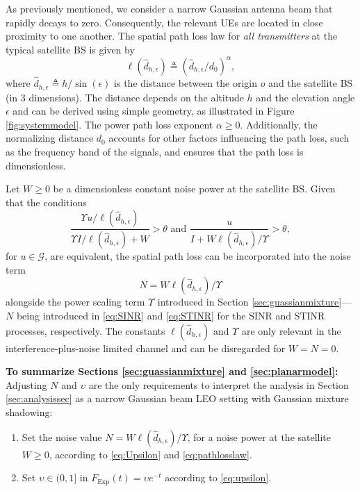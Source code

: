 \documentclass[lettersize,journal]{IEEEtran}
\begin{document}
As previously mentioned, we consider a narrow Gaussian antenna beam that rapidly decays to zero. Consequently, the relevant UEs are located in close proximity to one another. The spatial path loss law for \textit{all transmitters} at the typical satellite BS is given by
\begin{equation}
  \label{eq:pathlosslaw}
  \ell(\hat{d}_{h,\epsilon}) \triangleq \left( {\hat{d}_{h,\epsilon}}/{d_0} \right)^{\alpha},
\end{equation}
where $\hat{d}_{h,\epsilon} \triangleq {h}/{\sin(\epsilon)}$ is the distance between the origin $\textit{o}$ and the satellite BS (in $3$ dimensions). The distance depends on the altitude $h$ and the elevation angle $\epsilon$ and can be derived using simple geometry, as illustrated in Figure \ref{fig:systemmodel}. The power path loss exponent $\alpha \geq 0$. Additionally, the normalizing distance $d_0$ accounts for other factors influencing the path loss, such as the frequency band of the signals, and ensures that the path loss is dimensionless.

Let $W\geq0$ be a dimensionless constant noise power at the satellite BS. Given that the conditions $$\frac{\Upsilon_{}u/\ell(\hat{d}_{h,\epsilon})}{\Upsilon_{}I/\ell(\hat{d}_{h,\epsilon}) + W}>\theta \text{ and } \frac{u}{I + W\ell(\hat{d}_{h,\epsilon})/\Upsilon_{}}> \theta,$$ for $u \in \mathcal{G}$, are equivalent, the spatial path loss can be incorporated into the noise term \begin{equation}N=W\ell(\hat{d}_{h,\epsilon})/\Upsilon_{}\end{equation} alongside the power scaling term $\Upsilon_{}$ introduced in Section \ref{sec:guassianmixture}---$N$ being introduced in \eqref{eq:SINR} and \eqref{eq:STINR} for the SINR and STINR processes, respectively. The constants $\ell(\hat{d}_{h,\epsilon})$ and $\Upsilon_{}$ are only relevant in the interference-plus-noise limited channel and can be disregarded for $W=N=0$.



\textbf{To summarize Sections \ref{sec:guassianmixture} and \ref{sec:planarmodel}:} Adjusting $N$ and $\upsilon$ are the only requirements to interpret the analysis in Section \ref{sec:analysissec} as a narrow Gaussian beam LEO setting with Gaussian mixture shadowing:

\begin{enumerate}
    \item Set the noise value $N = {W \ell(\hat{d}_{h,\epsilon})}/{\Upsilon}$, for a noise power at the satellite $W \geq 0$, according to \eqref{eq:Upsilon} and \eqref{eq:pathlosslaw}.
    \item Set $\upsilon \in (0,1]$ in $F_{\text{Exp}}(t) = \upsilon e^{-t}$ according to \eqref{eq:upsilon}.
\end{enumerate}
\end{document}
